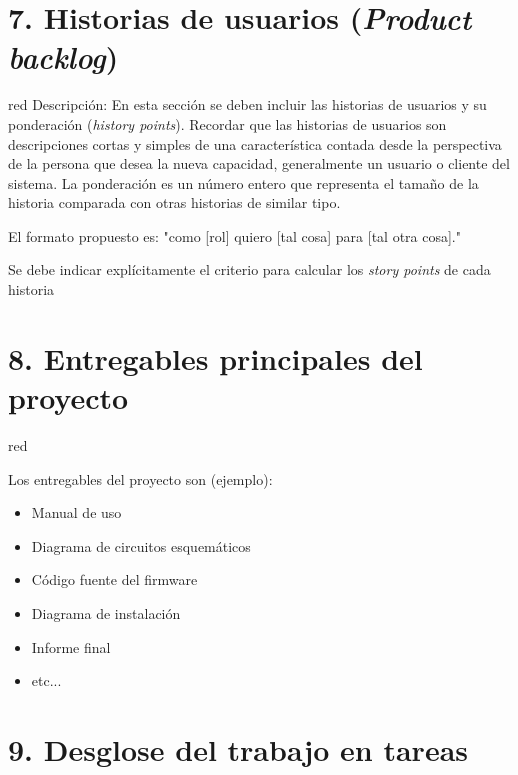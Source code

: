 \documentclass[
11pt, %
]{charter}
\begin{document}
\section{7. Historias de usuarios (\textit{Product backlog})}
\label{sec:backlog}

\begin{consigna}{red}
Descripción: En esta sección se deben incluir las historias de usuarios y su ponderación (\textit{history points}). Recordar que las historias de usuarios son descripciones cortas y simples de una característica contada desde la perspectiva de la persona que desea la nueva capacidad, generalmente un usuario o cliente del sistema. La ponderación es un número entero que representa el tamaño de la historia comparada con otras historias de similar tipo.

El formato propuesto es: "como [rol] quiero [tal cosa] para [tal otra cosa]."

Se debe indicar explícitamente el criterio para calcular los \textit{story points} de cada historia
\end{consigna}

\section{8. Entregables principales del proyecto}
\label{sec:entregables}

\begin{consigna}{red}

Los entregables del proyecto son (ejemplo):

\begin{itemize}
	\item Manual de uso
	\item Diagrama de circuitos esquemáticos
	\item Código fuente del firmware
	\item Diagrama de instalación
	\item Informe final
	\item etc...
\end{itemize}

\end{consigna}

\section{9. Desglose del trabajo en tareas}
\label{sec:wbs}
\end{document}
